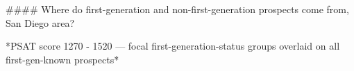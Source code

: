 #### Where do first-generation and non-first-generation prospects come from, San Diego area?

*PSAT score 1270 - 1520 — focal first-generation-status groups overlaid on all first-gen-known prospects*
